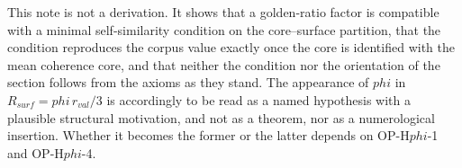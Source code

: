 \documentclass[11pt,a4paper]{article}
\def\varphi{phi}%
\def\mathrm#1{#1}%
\theoremstyle{definition}
\theoremstyle{plain}
\theoremstyle{remark}
\newcommand{\Rsurf}{R_{\mathrm{surf}}}
\newcommand{\rval}{r_{\mathrm{val}}}
\begin{document}
This note is not a derivation. It shows that a golden-ratio factor is compatible with a minimal self-similarity condition on the core--surface partition, that the condition reproduces the corpus value exactly once the core is identified with the mean coherence core, and that neither the condition nor the orientation of the section follows from the axioms as they stand. The appearance of $\varphi$ in $\Rsurf = \varphi\,\rval/3$ is accordingly to be read as a named hypothesis with a plausible structural motivation, and not as a theorem, nor as a numerological insertion. Whether it becomes the former or the latter depends on OP-H$\varphi$-1 and OP-H$\varphi$-4.



\end{document}
